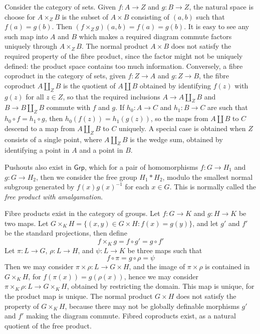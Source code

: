 \begin{example}
    Consider the category of sets. Given $f: A \to Z$ and $g: B \to Z$, the natural space is choose for $A \times_Z B$ is the subset of $A \times B$ consisting of $(a,b)$ such that $f(a) = g(b)$. Then $(f \times_Z g)(a,b) = f(a) = g(b)$. It is easy to see any such map into $A$ and $B$ which makes a required diagram commute factors uniquely through $A \times_Z B$. The normal product $A \times B$ does not satisfy the required property of the fibre product, since the factor might not be uniquely defined: the product space contains too much information. Conversely, a fibre coproduct in the category of sets, given $f: Z \to A$ and $g: Z \to B$, the fibre coproduct $A \coprod_Z B$ is the quotient of $A \coprod B$ obtained by identifying $f(z)$ with $g(z)$ for all $z \in Z$, so that the required inclusions $A \to A \coprod_Z B$ and $B \to B \coprod_Z B$ commute with $f$ and $g$. If $h_0: A \to C$ and $h_1: B \to C$ are such that $h_0 \circ f = h_1 \circ g$, then $h_0(f(z)) = h_1(g(z))$, so the maps from $A \coprod B$ to $C$ descend to a map from $A \coprod_Z B$ to $C$ uniquely. A special case is obtained when $Z$ consists of a single point, where $A \coprod_Z B$ is the wedge sum, obtained by identifying a point in $A$ and a point in $B$.
\end{example}

\begin{example}
    Pushouts also exist in $\mathsf{Grp}$, which for a pair of homomorphisms $f: G \to H_1$ and $g: G \to H_2$, then we consider the free group $H_1 * H_2$, modulo the smallest normal subgroup generated by $f(x) g(x)^{-1}$ for each $x \in G$. This is normally called the \emph{free product with amalgamation}.
\end{example}

\begin{example}
    Fibre products exist in the category of groups. Let $f: G \to K$ and $g: H \to K$ be two maps. Let $G \times_K H = \{ (x,y) \in G \times H : f(x) = g(y) \}$, and let $g'$ and $f'$ be the standard projections, then define
    \[ f \times_K g = f \circ g' = g \circ f' \]
    Let $\pi: L \to G$, $\rho: L \to H$, and $\psi: L \to K$ be three maps such that
    \[ f \circ \pi = g \circ \rho = \psi \]
    Then we may consider $\pi \times \rho: L \to G \times H$, and the image of $\pi \times \rho$ is contained in $G \times_K H$, for $f(\pi(x)) = g(\rho(x))$, hence we may consider $\pi \times_K \rho: L \to G \times_K H$, obtained by restricting the domain. This map is unique, for the product map is unique. The normal product $G \times H$ does not satisfy the property of $G \times_K H$, because there may not be globally definable morphisms $g'$ and $f'$ making the diagram commute. Fibred coproducts exist, as a natural quotient of the free product.
\end{example}


